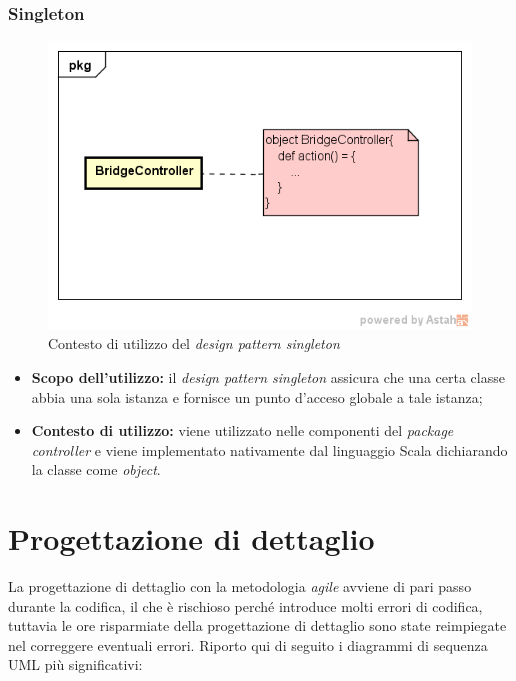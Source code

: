 \subsubsection{Singleton}
\begin{figure}[h]
\centering
\includegraphics[scale=0.50]{immagini/singleton}
\caption{Contesto di utilizzo del \emph{design pattern singleton}}
\label{fig:pattern-singleton}
\end{figure}
\begin{itemize}
\item\textbf{Scopo dell'utilizzo:} il \emph{design pattern singleton} assicura che una certa classe abbia una sola istanza e fornisce un punto d'acceso globale a tale istanza;
\item \textbf{Contesto di utilizzo:} viene utilizzato nelle componenti del \emph{package controller} e viene implementato nativamente dal linguaggio Scala dichiarando la classe come \emph{object}.
\end{itemize}



\newpage
\section{Progettazione di dettaglio}
La progettazione di dettaglio con la metodologia \emph{agile} avviene di pari passo durante la codifica, il che è rischioso perché introduce molti errori di codifica, tuttavia le ore risparmiate della progettazione di dettaglio sono state reimpiegate nel correggere eventuali errori. Riporto qui di seguito i diagrammi di sequenza UML più significativi:
